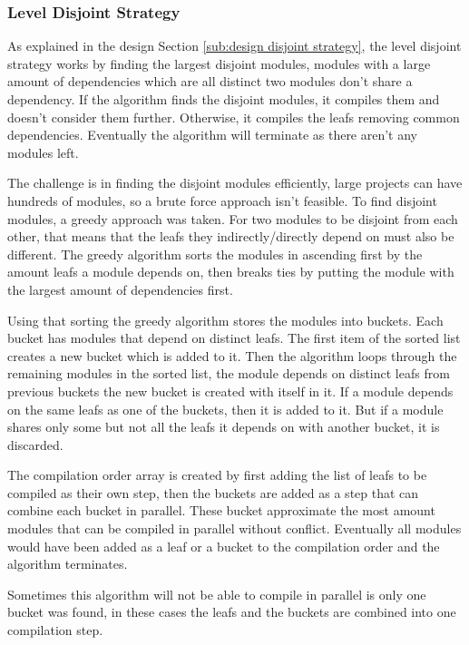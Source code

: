 \subsubsection{Level Disjoint Strategy} \label{sub:imp disj strategy}

As explained in the design Section \ref{sub:design disjoint strategy}, the
level disjoint strategy works by finding the largest disjoint modules, modules
with a large amount of dependencies which are all distinct two modules don't
share a dependency. If the algorithm finds the disjoint modules, it compiles
them and doesn't consider them further. Otherwise, it compiles the leafs
removing common dependencies. Eventually the algorithm will terminate as there
aren't any modules left.

The challenge is in finding the disjoint modules efficiently, large projects
can have hundreds of modules, so a brute force approach isn't feasible. To find
disjoint modules, a greedy approach was taken. For two modules to be disjoint
from each other, that means that the leafs they indirectly/directly depend on
must also be different. The greedy algorithm sorts the modules in ascending
first by the amount leafs a module depends on, then breaks ties by putting the
module with the largest amount of  dependencies first.

Using that sorting the greedy algorithm stores the modules into buckets. Each
bucket has modules that depend on distinct leafs. The first item of the sorted
list creates a new bucket which is added to it. Then the algorithm loops through
the remaining modules in the sorted list, the module depends on distinct leafs
from previous buckets the new bucket is created with itself in it. If a
module depends on the same leafs as one of the buckets, then it is added to it.
But if a module shares only some but not all the leafs it depends on with
another bucket, it is discarded.

The compilation order array is created by first adding the list of leafs to be
compiled as their own step, then the buckets are added as a step that can
combine each bucket in parallel. These bucket approximate the most amount
modules that can be compiled in parallel without conflict. Eventually all
modules would have been added as a leaf or a bucket to the compilation order
and the algorithm terminates.

Sometimes this algorithm will not be able to compile in parallel is only one
bucket was found, in these cases the leafs and the buckets are combined into
one compilation step.

